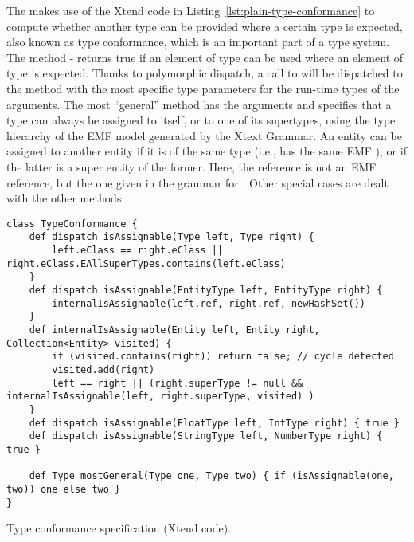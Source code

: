 The  makes use of the Xtend code in
Listing~\ref{lst:plain-type-conformance} to compute whether another type can be
provided where a certain type is expected, also known as type conformance,
which is an important part of a type system. 
The method -  returns true if an element of
type  can be used where an element of type  is expected.
Thanks to polymorphic dispatch, a call to  will be
dispatched to the method with the most specific type parameters for the run-time
types of the arguments. The most ``general'' method has the arguments
 and specifies that a type can always be assigned to itself,
or to one of its supertypes, using the type hierarchy of the EMF model generated
by the Xtext Grammar.
An entity can be assigned to another entity if it is of the same type (i.e., has
the same EMF ), or if the latter is a super entity of the former.
Here, the reference  is not an EMF reference, but the one given
in the grammar for . Other special cases are dealt with the
other methods. 

\begin{listing}[tb]
\begin{lstlisting}[language=xtend] 
class TypeConformance {
	def dispatch isAssignable(Type left, Type right) {
		left.eClass == right.eClass || right.eClass.EAllSuperTypes.contains(left.eClass) 
	}
	def dispatch isAssignable(EntityType left, EntityType right) {
		internalIsAssignable(left.ref, right.ref, newHashSet())
	}
	def internalIsAssignable(Entity left, Entity right, Collection<Entity> visited) {
		if (visited.contains(right)) return false; // cycle detected
		visited.add(right)
		left == right || (right.superType != null && internalIsAssignable(left, right.superType, visited) )
	}
	def dispatch isAssignable(FloatType left, IntType right) { true }
	def dispatch isAssignable(StringType left, NumberType right) { true }

	def Type mostGeneral(Type one, Type two) { if (isAssignable(one, two)) one else two }
}
\end{lstlisting}
\caption{Type conformance specification (Xtend code).}
\label{lst:plain-type-conformance}
\end{listing}

